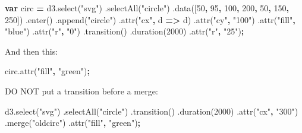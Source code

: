 \documentclass[openany]{book}
\newenvironment{Shaded}{\begin{snugshade}}{\end{snugshade}}
\newcommand{\AttributeTok}[1]{\textcolor[rgb]{0.77,0.63,0.00}{#1}}
\newcommand{\DecValTok}[1]{\textcolor[rgb]{0.00,0.00,0.81}{#1}}
\newcommand{\KeywordTok}[1]{\textcolor[rgb]{0.13,0.29,0.53}{\textbf{#1}}}
\newcommand{\NormalTok}[1]{#1}
\newcommand{\OperatorTok}[1]{\textcolor[rgb]{0.81,0.36,0.00}{\textbf{#1}}}
\newcommand{\StringTok}[1]{\textcolor[rgb]{0.31,0.60,0.02}{#1}}
\newcommand{\VariableTok}[1]{\textcolor[rgb]{0.00,0.00,0.00}{#1}}
\begin{document}
\begin{Shaded}
\begin{Highlighting}[]
\KeywordTok{var}\NormalTok{ circ }\OperatorTok{=} \VariableTok{d3}\NormalTok{.}\AttributeTok{select}\NormalTok{(}\StringTok{"svg"}\NormalTok{)}
\NormalTok{  .}\AttributeTok{selectAll}\NormalTok{(}\StringTok{"circle"}\NormalTok{)}
\NormalTok{  .}\AttributeTok{data}\NormalTok{([}\DecValTok{50}\OperatorTok{,} \DecValTok{95}\OperatorTok{,} \DecValTok{100}\OperatorTok{,} \DecValTok{200}\OperatorTok{,} \DecValTok{50}\OperatorTok{,} \DecValTok{150}\OperatorTok{,} \DecValTok{250}\NormalTok{])}
\NormalTok{  .}\AttributeTok{enter}\NormalTok{()}
\NormalTok{  .}\AttributeTok{append}\NormalTok{(}\StringTok{"circle"}\NormalTok{)}
\NormalTok{    .}\AttributeTok{attr}\NormalTok{(}\StringTok{"cx"}\OperatorTok{,}\NormalTok{ d }\OperatorTok{=>}\NormalTok{ d)}
\NormalTok{    .}\AttributeTok{attr}\NormalTok{(}\StringTok{"cy"}\OperatorTok{,} \StringTok{"100"}\NormalTok{)}
\NormalTok{    .}\AttributeTok{attr}\NormalTok{(}\StringTok{"fill"}\OperatorTok{,} \StringTok{"blue"}\NormalTok{)}
\NormalTok{    .}\AttributeTok{attr}\NormalTok{(}\StringTok{"r"}\OperatorTok{,} \StringTok{"0"}\NormalTok{)}
\NormalTok{    .}\AttributeTok{transition}\NormalTok{()}
\NormalTok{    .}\AttributeTok{duration}\NormalTok{(}\DecValTok{2000}\NormalTok{)}
\NormalTok{    .}\AttributeTok{attr}\NormalTok{(}\StringTok{"r"}\OperatorTok{,} \StringTok{"25"}\NormalTok{)}\OperatorTok{;}
\end{Highlighting}
\end{Shaded}

And then this:

\begin{Shaded}
\begin{Highlighting}[]
\VariableTok{circ}\NormalTok{.}\AttributeTok{attr}\NormalTok{(}\StringTok{"fill"}\OperatorTok{,} \StringTok{"green"}\NormalTok{)}\OperatorTok{;}
\end{Highlighting}
\end{Shaded}

DO NOT put a transition before a merge:

\begin{Shaded}
\begin{Highlighting}[]
\VariableTok{d3}\NormalTok{.}\AttributeTok{select}\NormalTok{(}\StringTok{"svg"}\NormalTok{)}
\NormalTok{  .}\AttributeTok{selectAll}\NormalTok{(}\StringTok{"circle"}\NormalTok{)}
\NormalTok{  .}\AttributeTok{transition}\NormalTok{()}
\NormalTok{  .}\AttributeTok{duration}\NormalTok{(}\DecValTok{2000}\NormalTok{)}
\NormalTok{    .}\AttributeTok{attr}\NormalTok{(}\StringTok{"cx"}\OperatorTok{,} \StringTok{"300"}\NormalTok{)}
\NormalTok{  .}\AttributeTok{merge}\NormalTok{(}\StringTok{"oldcirc"}\NormalTok{)}
\NormalTok{    .}\AttributeTok{attr}\NormalTok{(}\StringTok{"fill"}\OperatorTok{,} \StringTok{"green"}\NormalTok{)}\OperatorTok{;}
\end{Highlighting}
\end{Shaded}
\end{document}
